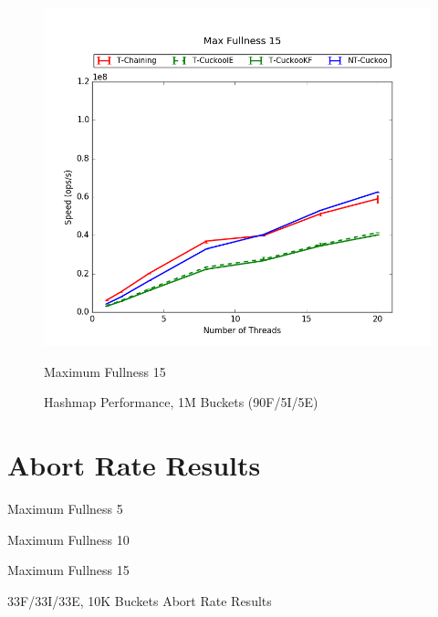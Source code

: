 \begin{figure}[H]
\begin{minipage}{0.45\textwidth}
    \end{minipage}
	\begin{minipage}{0.45\textwidth}\includegraphics[width=\textwidth]{maps/15HM1M:F90,I5,E5.png} 
        \caption*{Maximum Fullness 15}
    \end{minipage}
	\caption{Hashmap Performance, 1M Buckets (90F/5I/5E)}
\end{figure}



\section{Abort Rate Results}

\begin{table}[H]
    \centering
    \begin{minipage}{.45\textwidth}
    \centering
        
        \caption*{Maximum Fullness 5}
    \end{minipage}
    \begin{minipage}{.45\textwidth}
    \centering
        
        \caption*{Maximum Fullness 10}
    \end{minipage}
    \begin{minipage}{.45\textwidth}
    \centering
        
        \caption*{Maximum Fullness 15}
    \end{minipage}
    \caption{33F/33I/33E, 10K Buckets Abort Rate Results}
\end{table}

